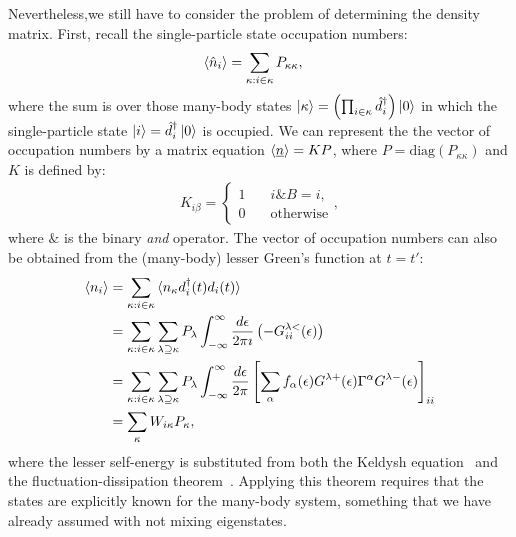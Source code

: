 \documentclass{article}
\begin{document}
\begin{multicols}{2}
        Nevertheless,we still have to consider the problem of determining the density matrix. First, recall the single-particle state occupation numbers:
        \begin{align*}
            \braket{\hat{n}_i} &= \sum_{\kappa: i\in \kappa} P_{\kappa\kappa},
        \end{align*}
        where the sum is over those many-body states $\ket{\kappa}=\left(\prod_{i\in\kappa}\hat{d}_i^\dagger \right)\ket{0}$ in which the single-particle state $\ket{i} = \hat{d}_i^\dagger \ket{0}$ is occupied. We can represent the the vector of occupation numbers by a matrix equation $\braket{\underline{n}} = KP$, where $P=\text{diag}(P_{\kappa\kappa})$ and $K$ is defined by:
        \begin{align}
            K_{i\beta} = \begin{cases} 1 & \quad i\&B=i, \\ 0 & \quad\text{otherwise}\end{cases},
        \label{eq:kmatrix}\end{align}
        where $\&$ is the binary \emph{and} operator. 
        The vector of occupation numbers can also be obtained from the (many-body) lesser Green's function at $t=t'$:
        \begin{align} 
            \braket{n_i} &= \sum_{\kappa: i \in \kappa} \braket{n_\kappa d_i^\dagger (t) d_i (t)} \nonumber\\ 
            &= \sum_{\kappa: i \in \kappa} \sum_{\lambda \supseteq \kappa} P_\lambda \int^\infty_{-\infty} \frac{d\epsilon}{2\pi\imath} \left(-G^{\lambda<}_{ii} (\epsilon)\right) \nonumber\\
            &= \sum_{\kappa: i \in \kappa} \sum_{\lambda \supseteq \kappa} P_\lambda \int^\infty_{-\infty} \frac{d\epsilon}{2\pi} \left[ \sum_\alpha f_\alpha(\epsilon) G^{\lambda+}(\epsilon) \Gamma^\alpha G^{\lambda-}(\epsilon)\right]_{ii} \nonumber\\ 
            &= \sum_\kappa W_{i\kappa} P_\kappa, \label{eq:wmatrix}
        \end{align}
        where the lesser self-energy is substituted from both the Keldysh equation~\cite{diventra} and the fluctuation-dissipation theorem~\cite{haugjauho}. Applying this theorem requires that the states are explicitly known for the many-body system, something that we have already assumed with not mixing eigenstates.       
        

\end{multicols}
\end{document}
